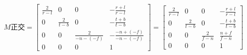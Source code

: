 $$
M正交=
\begin{bmatrix}
  \frac{2}{r-l} & 0 & 0 & -\frac{r+l}{r-l} \\
  0 & \frac{2}{t-b} & 0 & -\frac{t+b}{t-b} \\
  0 & 0 & \frac{2}{-n-(-f)} & -\frac{-n+(-f)}{-n-(-f)} \\
  0 & 0 & 0 & 1
\end{bmatrix}
=
\begin{bmatrix}
  \frac{2}{r-l} & 0 & 0 & -\frac{r+l}{r-l} \\
  0 & \frac{2}{t-b} & 0 & -\frac{t+b}{t-b} \\
  0 & 0 & \frac{2}{f-n} & \frac{n+f}{f-n} \\
  0 & 0 & 0 & 1
\end{bmatrix}
$$